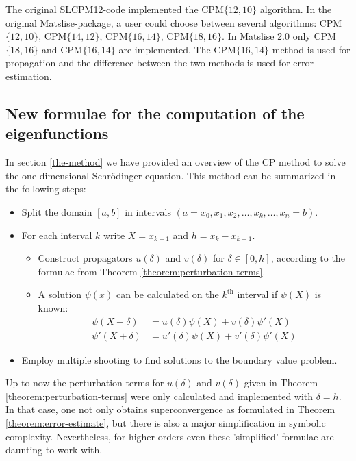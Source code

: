The original SLCPM12-code implemented the CPM$\{12,10\}$ algorithm. In the original Matslise-package, a user could choose between several algorithms: CPM$\{12,10\}$, CPM$\{14,12\}$, CPM$\{16,14\}$, CPM$\{18,16\}$.
In Matslise 2.0 only CPM$\{18,16\}$ and CPM$\{16,14\}$ are implemented. The CPM$\{16,14\}$ method is used for propagation and the difference between the two methods is used for error estimation.

\subsection{New formulae for the computation of the eigenfunctions}\label{sec:c2_cp_in_delta}

In section \ref{the-method} we have provided an overview of the CP method to solve the one-dimensional Schrödinger equation. This method can be summarized in the following steps:
\begin{itemize}
    \item Split the domain $[a, b]$ in intervals $(a=x_0, x_1, x_2, \dots, x_k, \dots, x_n = b)$.
    \item For each interval $k$ write $X = x_{k-1}$ and $h = x_k - x_{k-1}$. \begin{itemize}
              \item Construct propagators $u(\delta)$ and $v(\delta)$ for $\delta \in [0, h]$, according to the formulae from Theorem \ref{theorem:perturbation-terms}.
              \item A solution $\psi(x)$ can be calculated on the $k^\text{th}$ interval if $\psi(X)$ is known:
                    \begin{align*}
                        \psi(X+\delta)  & = u(\delta)\psi(X) + v(\delta)\psi'(X)   \\
                        \psi'(X+\delta) & = u'(\delta)\psi(X) + v'(\delta)\psi'(X)
                    \end{align*}
          \end{itemize}
    \item Employ multiple shooting to find solutions to the boundary value problem.
\end{itemize}

Up to now the perturbation terms for $u(\delta)$ and $v(\delta)$ given in Theorem \ref{theorem:perturbation-terms} were only calculated and implemented with $\delta = h$. In that case, one not only obtains superconvergence as formulated in Theorem \ref{theorem:error-estimate}, but there is also a major simplification in symbolic complexity. Nevertheless, for higher orders even these 'simplified' formulae are daunting to work with.

